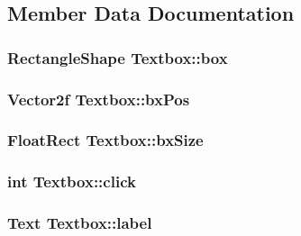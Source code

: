 \subsection{Member Data Documentation}
\subsubsection[{\texorpdfstring{box}{box}}]{\setlength{\rightskip}{0pt plus 5cm}Rectangle\+Shape Textbox\+::box\hspace{0.3cm}{\ttfamily [private]}}\hypertarget{class_textbox_a6df176e39969833d37fbfd23ca58562e}{}\label{class_textbox_a6df176e39969833d37fbfd23ca58562e}
\subsubsection[{\texorpdfstring{bx\+Pos}{bxPos}}]{\setlength{\rightskip}{0pt plus 5cm}Vector2f Textbox\+::bx\+Pos\hspace{0.3cm}{\ttfamily [private]}}\hypertarget{class_textbox_add24b3a209a1d5a0251b1057cdc6084f}{}\label{class_textbox_add24b3a209a1d5a0251b1057cdc6084f}
\subsubsection[{\texorpdfstring{bx\+Size}{bxSize}}]{\setlength{\rightskip}{0pt plus 5cm}Float\+Rect Textbox\+::bx\+Size\hspace{0.3cm}{\ttfamily [private]}}\hypertarget{class_textbox_a4a3edf52ef4009bd4cd7745cf5d5907b}{}\label{class_textbox_a4a3edf52ef4009bd4cd7745cf5d5907b}
\subsubsection[{\texorpdfstring{click}{click}}]{\setlength{\rightskip}{0pt plus 5cm}int Textbox\+::click\hspace{0.3cm}{\ttfamily [private]}}\hypertarget{class_textbox_af2a81ca56d4beaf3fe662b2ea9d3ccb0}{}\label{class_textbox_af2a81ca56d4beaf3fe662b2ea9d3ccb0}
\subsubsection[{\texorpdfstring{label}{label}}]{\setlength{\rightskip}{0pt plus 5cm}Text Textbox\+::label\hspace{0.3cm}{\ttfamily [private]}}\hypertarget{class_textbox_a4e073ba8f958d44afb49293247d514ad}{}\label{class_textbox_a4e073ba8f958d44afb49293247d514ad}
